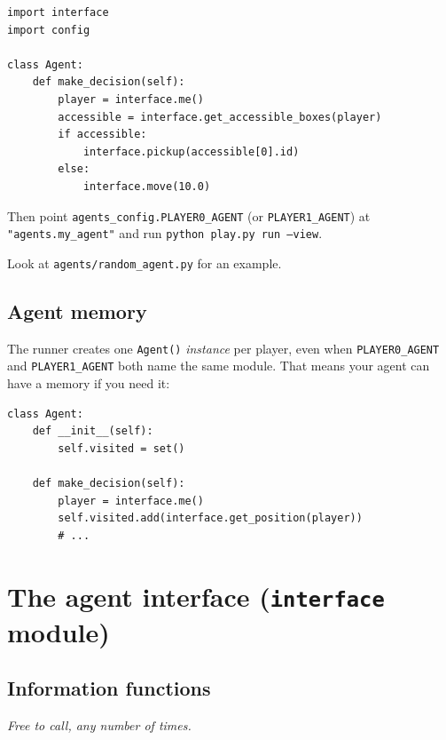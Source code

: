 \documentclass[11pt,a4paper]{article}
\newcommand{\code}[1]{\texttt{#1}}
\begin{document}
\begin{lstlisting}
import interface
import config

class Agent:
    def make_decision(self):
        player = interface.me()
        accessible = interface.get_accessible_boxes(player)
        if accessible:
            interface.pickup(accessible[0].id)
        else:
            interface.move(10.0)
\end{lstlisting}

Then point \code{agents\_config.PLAYER0\_AGENT} (or \code{PLAYER1\_AGENT})
at \code{"agents.my\_agent"} and run \code{python play.py run --view}.

Look at \code{agents/random\_agent.py} for an example.

\subsection{Agent memory}
\label{sec:memory}

The runner creates one \code{Agent()} \emph{instance} per player, even
when \code{PLAYER0\_AGENT} and \code{PLAYER1\_AGENT} both name the same
module. That means your agent can have a memory if you need it:

\begin{lstlisting}
class Agent:
    def __init__(self):
        self.visited = set()

    def make_decision(self):
        player = interface.me()
        self.visited.add(interface.get_position(player))
        # ...
\end{lstlisting}

\newpage
\section{The agent interface (\code{interface} module)}

\subsection{Information functions}
\emph{Free to call, any number of times.}
\end{document}
